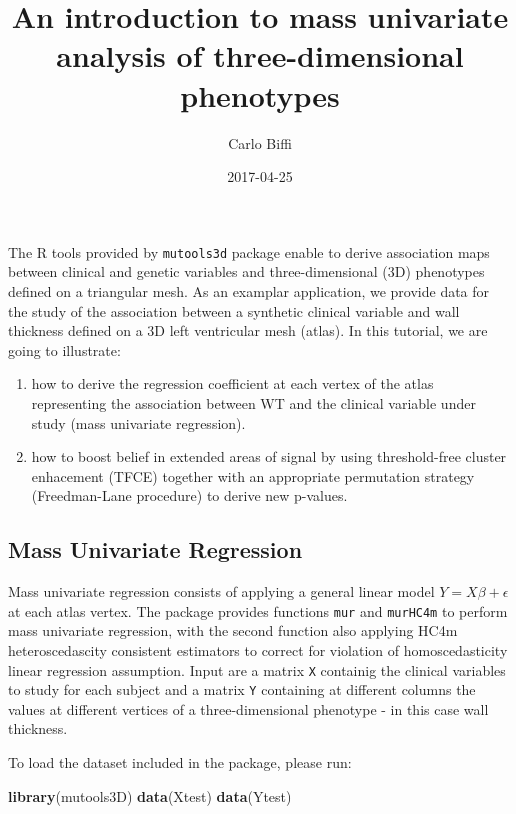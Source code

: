 \documentclass[]{article}
\title{An introduction to mass univariate analysis of three-dimensional
phenotypes}
\author{Carlo Biffi}
\date{2017-04-25}
\newenvironment{Shaded}{\begin{snugshade}}{\end{snugshade}}
\newcommand{\KeywordTok}[1]{\textcolor[rgb]{0.13,0.29,0.53}{\textbf{{#1}}}}
\newcommand{\NormalTok}[1]{{#1}}
\providecommand{\tightlist}{%
  \setlength{\itemsep}{0pt}\setlength{\parskip}{0pt}}
\begin{document}
\maketitle

The R tools provided by \texttt{mutools3d} package enable to derive
association maps between clinical and genetic variables and
three-dimensional (3D) phenotypes defined on a triangular mesh. As an
examplar application, we provide data for the study of the association
between a synthetic clinical variable and wall thickness defined on a 3D
left ventricular mesh (atlas). In this tutorial, we are going to
illustrate:

\begin{enumerate}
\def\labelenumi{\arabic{enumi}.}
\tightlist
\item
  how to derive the regression coefficient at each vertex of the atlas
  representing the association between WT and the clinical variable
  under study (mass univariate regression).
\item
  how to boost belief in extended areas of signal by using
  threshold-free cluster enhacement (TFCE) together with an appropriate
  permutation strategy (Freedman-Lane procedure) to derive new p-values.
\end{enumerate}

\subsection{Mass Univariate
Regression}\label{mass-univariate-regression}

Mass univariate regression consists of applying a general linear model
\(Y = X\beta + \epsilon\) at each atlas vertex. The package provides
functions \texttt{mur} and \texttt{murHC4m} to perform mass univariate
regression, with the second function also applying HC4m heteroscedascity
consistent estimators to correct for violation of homoscedasticity
linear regression assumption. Input are a matrix \texttt{X} containig
the clinical variables to study for each subject and a matrix \texttt{Y}
containing at different columns the values at different vertices of a
three-dimensional phenotype - in this case wall thickness.

To load the dataset included in the package, please run:

\begin{Shaded}
\begin{Highlighting}[]
\KeywordTok{library}\NormalTok{(mutools3D)}
\KeywordTok{data}\NormalTok{(Xtest)}
\KeywordTok{data}\NormalTok{(Ytest)}
\end{Highlighting}
\end{Shaded}
\end{document}
